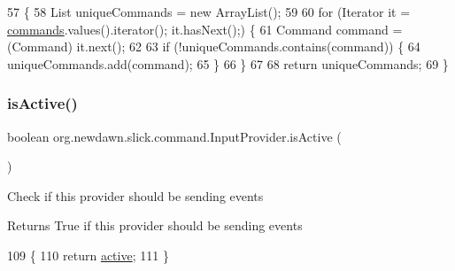 \begin{DoxyCode}
57                                     \{
58         List uniqueCommands = \textcolor{keyword}{new} ArrayList();
59 
60         \textcolor{keywordflow}{for} (Iterator it = \mbox{\hyperlink{classorg_1_1newdawn_1_1slick_1_1command_1_1_input_provider_ab2bd0c08506a59bc7457d7a87cf873d2}{commands}}.values().iterator(); it.hasNext();) \{
61             Command command = (Command) it.next();
62 
63             \textcolor{keywordflow}{if} (!uniqueCommands.contains(command)) \{
64                 uniqueCommands.add(command);
65             \}
66         \}
67 
68         \textcolor{keywordflow}{return} uniqueCommands;
69     \}
\end{DoxyCode}
\mbox{\label{classorg_1_1newdawn_1_1slick_1_1command_1_1_input_provider_a13cd156adf59ef712b9ebb4c0c21f2b8}} 
\subsubsection{\texorpdfstring{is\+Active()}{isActive()}}
{\footnotesize\ttfamily boolean org.\+newdawn.\+slick.\+command.\+Input\+Provider.\+is\+Active (\begin{DoxyParamCaption}{ }\end{DoxyParamCaption})\hspace{0.3cm}{\ttfamily [inline]}}

Check if this provider should be sending events

\begin{DoxyReturn}{Returns}
True if this provider should be sending events 
\end{DoxyReturn}

\begin{DoxyCode}
109                               \{
110         \textcolor{keywordflow}{return} \mbox{\hyperlink{classorg_1_1newdawn_1_1slick_1_1command_1_1_input_provider_ad390b811fb89db3fde054cc1ecae20b0}{active}};
111     \}
\end{DoxyCode}
\mbox{\label{classorg_1_1newdawn_1_1slick_1_1command_1_1_input_provider_a68409d18dded86e1d03b62f33b7e573a}} 
